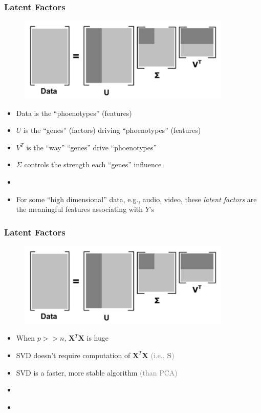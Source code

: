 \documentclass[xcolor={dvipsnames}]{beamer}
\begin{document}
\frame
{
 \frametitle{Latent Factors}


\vspace{.6em}

\begin{figure}
\includegraphics[width=4in]{stuff/svd.png} 
\end{figure}

\vspace{-.4em}


\begin{itemize}
\item Data is the ``phoenotypes'' (features)
\item $U$ is the ``genes'' (factors) driving ``phoenotypes'' (features)
\item $V^T$ is the ``way'' ``genes'' drive  ``phoenotypes''
\item $\Sigma$ controls the strength each ``genes'' influence
\item[]
\item<2-> For some ``high dimensional'' data, e.g., audio, video, these \emph{latent factors}
are the meaningful features associating with $Y$'s
\end{itemize}

}

\frame
{
 \frametitle{Latent Factors}


\begin{figure}
\includegraphics[width=4in]{stuff/svd.png} 
\end{figure}

\vspace{-.425em}

\begin{itemize}
\item When $p > > n$, ${\boldsymbol X}^T{\boldsymbol X}$ is huge
\item SVD doesn't require computation of ${\boldsymbol X}^T{\boldsymbol X}$  \textcolor{gray}{(i.e., ${\boldsymbol S}$)}
\item SVD is a faster, more stable algorithm \textcolor{gray}{(than PCA)}
\item[]
\item[] $\;$\\$\;$
\end{itemize}
}
\end{document}
